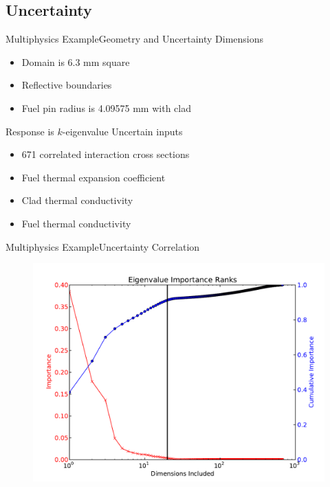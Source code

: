 \documentclass{beamer}
\begin{document}
\subsection{Uncertainty}
\begin{frame}{Multiphysics Example}{Geometry and Uncertainty}\vspace{-20pt}
  \vfill
  Dimensions
  \begin{itemize}
    \item Domain is 6.3 mm square
    \item Reflective boundaries
    \item Fuel pin radius is 4.09575 mm with clad
  \end{itemize}
  \vfill
  Response is $k$-eigenvalue
  \vfill
  Uncertain inputs
  \begin{itemize}
    \item 671 correlated interaction cross sections
    \item Fuel thermal expansion coefficient
    \item Clad thermal conductivity
    \item Fuel thermal conductivity
  \end{itemize}
  \vfill
\end{frame}

\begin{frame}{Multiphysics Example}{Uncertainty Correlation}\vspace{-20pt}
      \begin{figure}
        \centering
        \includegraphics[width=0.8\linewidth]{mammoth/pincell_eigenvalue_impranks}
      \end{figure}
\end{frame}
\end{document}
